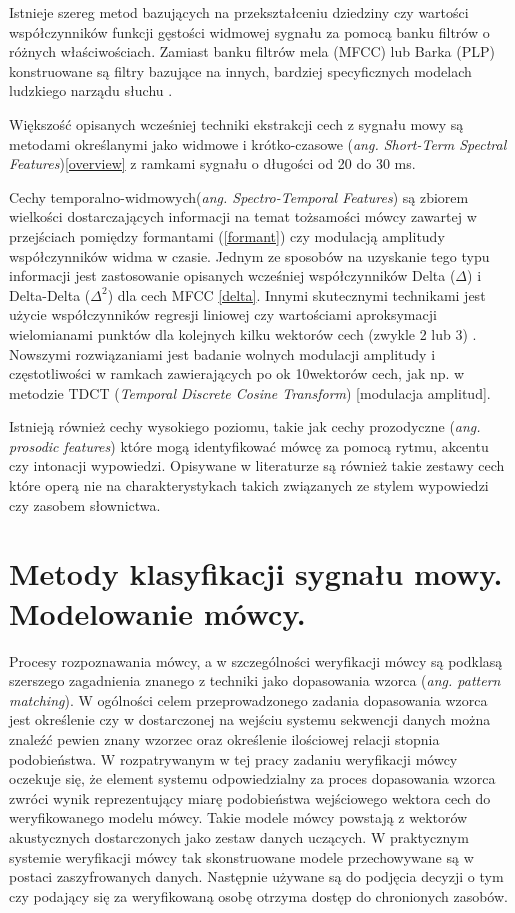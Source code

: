 Istnieje szereg metod bazujących na przekształceniu dziedziny czy wartości współczynników funkcji gęstości widmowej sygnału za pomocą banku filtrów o różnych właściwościach. Zamiast banku filtrów mela (MFCC) lub Barka (PLP) konstruowane są filtry bazujące na innych, bardziej specyficznych modelach ludzkiego narządu słuchu \cite{fosr}.

Większość opisanych wcześniej techniki ekstrakcji cech z sygnału mowy są metodami określanymi jako widmowe i krótko-czasowe (\textit{ang. Short-Term Spectral Features})\ref{overview} z ramkami sygnału o długości od 20 do 30 ms.

Cechy temporalno-widmowych(\textit{ang. Spectro-Temporal Features})\cite{overview} są zbiorem wielkości dostarczających informacji na temat tożsamości mówcy zawartej w przejściach pomiędzy formantami (\ref{formant}) czy modulacją amplitudy współczynników widma w czasie. Jednym ze sposobów na uzyskanie tego typu informacji jest zastosowanie opisanych wcześniej współczynników Delta ($\Delta$) i Delta-Delta ($\Delta^2$) dla cech MFCC \ref{delta}. Innymi skutecznymi technikami jest użycie współczynników regresji liniowej  czy wartościami aproksymacji wielomianami punktów dla kolejnych kilku wektorów cech (zwykle 2 lub 3) \cite{multidsp}. Nowszymi rozwiązaniami jest badanie wolnych modulacji amplitudy i częstotliwości w ramkach zawierających po ok 10wektorów cech, jak np. w metodzie TDCT (\textit{Temporal Discrete Cosine Transform}) [modulacja amplitud].

Istnieją również cechy wysokiego poziomu, takie jak cechy prozodyczne (\textit{ang. prosodic features}) które mogą identyfikować mówcę za pomocą rytmu, akcentu czy intonacji wypowiedzi. Opisywane w literaturze są również takie zestawy cech które operą nie na charakterystykach takich związanych ze stylem wypowiedzi czy zasobem słownictwa\cite{overview}.
\section{Metody klasyfikacji sygnału mowy. Modelowanie mówcy.}
\label{featurematching}

Procesy rozpoznawania mówcy, a w szczególności weryfikacji mówcy są podklasą szerszego zagadnienia znanego z techniki jako dopasowania wzorca (\textit{ang. pattern matching}). W ogólności celem przeprowadzonego zadania dopasowania wzorca jest określenie czy w dostarczonej na wejściu systemu sekwencji danych można znaleźć pewien znany wzorzec oraz określenie ilościowej relacji stopnia podobieństwa. W rozpatrywanym w tej pracy zadaniu weryfikacji mówcy oczekuje się, że element systemu odpowiedzialny za proces dopasowania wzorca zwróci wynik reprezentujący miarę podobieństwa wejściowego wektora cech do weryfikowanego modelu mówcy. Takie modele mówcy powstają z wektorów akustycznych dostarczonych jako zestaw danych uczących. W praktycznym systemie weryfikacji mówcy tak skonstruowane modele przechowywane są w postaci zaszyfrowanych danych. Następnie używane są do podjęcia decyzji o tym czy podający się za weryfikowaną osobę otrzyma dostęp do chronionych zasobów.

